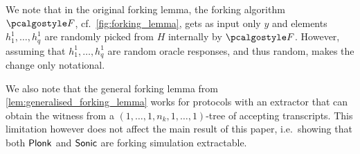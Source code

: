 We note that in the original forking lemma, the forking algorithm $\forking$,
cf.~\cref{fig:forking_lemma}, gets as input only $y$ and elements $h^1_1, \ldots,
h^1_q$ are randomly picked from $H$ internally by $\forking$. However, assuming
that $h^1_1, \ldots, h^1_q$ are random oracle responses, and thus random, makes
the change only notational.

We also note that the general forking lemma from
\cref{lem:generalised_forking_lemma} works for protocols with an extractor that can obtain the
witness from a $(1, \ldots, 1, n_k, 1, \ldots, 1)$-tree of accepting
transcripts. This limitation however does not affect the main result of this
paper, i.e.~showing that both $\textnormal{\textsf{Plonk}}$ and ${\textnormal{\textsf{Sonic}}}$ are forking simulation extractable.

%
%
%
%

